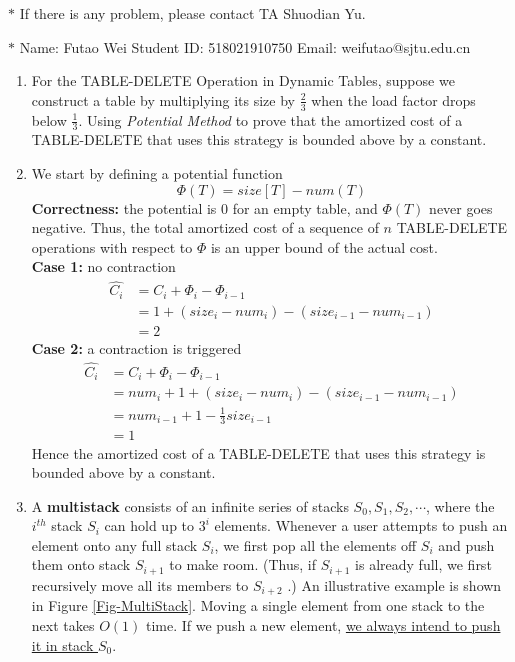 \documentclass[12pt,a4paper]{article}
\makeatletter
\newtheorem*{solution}{Solution}
\theoremstyle{definition}
\renewenvironment{solution}[1][Solution] {\par\pushQED{\qed}\normalfont\topsep6\p@\@plus6\p@\relax\trivlist\item[\hskip\labelsep\bfseries#1\@addpunct{.}]\ignorespaces}{\popQED\endtrivlist\@endpefalse} \makeatother
\makeatother
\begin{document}
\noindent

\noindent{}
\begin{center}
\footnotesize{\color{red}$*$ If there is any problem, please contact TA Shuodian Yu. }

\footnotesize{\color{blue}$*$ Name: Futao Wei  \quad Student ID: 518021910750 \quad Email: weifutao@sjtu.edu.cn}
\end{center}
\begin{enumerate}
	\item For the TABLE-DELETE Operation in Dynamic Tables, suppose we construct a table by multiplying its size by $\frac 23$ when the load factor drops below $\frac 13$. Using \emph{Potential Method} to prove that the amortized cost of a TABLE-DELETE that uses this strategy is bounded above by a constant.
	\begin{solution}
		We start by defining a potential function
		\[\Phi (T) = size[T] - num(T)\]
		\textbf{Correctness:} the potential is $0$ for an empty table, and $\Phi (T)$ never goes negative. Thus, the total amortized cost of a sequence of $n$ TABLE-DELETE operations with respect to $\Phi$ is an upper bound of the actual cost. \\
		\textbf{Case 1:} no contraction 
		\begin{align*}
			\hat{C_i} & = C_i + \Phi_i - \Phi_{i-1} \\
			& = 1 + (size_i - num_i) - (size_{i-1} - num_{i-1}) \\
			& = 2
		\end{align*}
		\textbf{Case 2:} a contraction is triggered
		\begin{align*}
			\hat{C_i} & = C_i + \Phi_i - \Phi_{i-1} \\
			& = num_i + 1 + (size_i - num_i) - (size_{i-1} - num_{i-1}) \\
			& = num_{i-1} + 1 - \frac{1}{3} size_{i-1} \\
			& = 1
		\end{align*}
		Hence the amortized cost of a TABLE-DELETE that uses this strategy is bounded above by a constant.
	\end{solution}
	
	\item A \textbf{multistack} consists of an infinite series of stacks $S_0, S_1, S_2,\cdots$, where the $i^{th}$ stack $S_i$ can hold up to $3^i$ elements. Whenever a user attempts to push an element onto any full stack $S_i$, we first pop all the elements off $S_i$ and push them onto stack $S_{i+1}$ to make room. (Thus, if $S_{i+1}$ is already full, we first recursively move all its members to $S_{i+2}$ .) An illustrative example is shown in Figure \ref{Fig-MultiStack}. Moving a single element from one stack to the next takes $O(1)$ time. If we push a new element, \underline{we always intend to push it in stack $S_0$}.


\end{enumerate}
\end{document}
